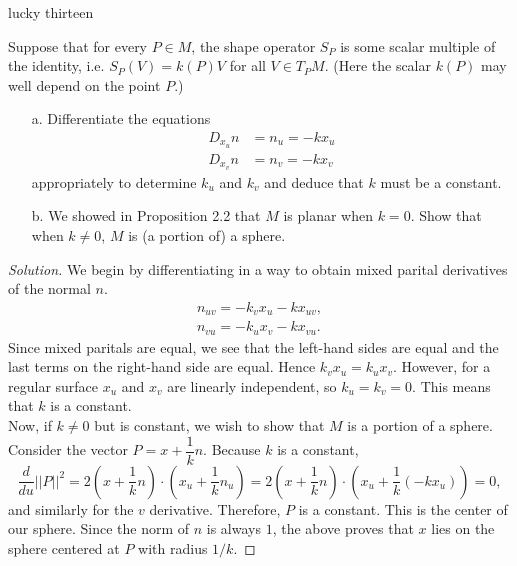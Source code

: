 \documentclass[Shifrin_Solutions_Spring_2018]{subfiles}
\begin{document}
\begin{exercise}
lucky thirteen
\end{exercise}

\begin{exercise}
Suppose that for every $P \in M$, the shape operator $S_P$ is some scalar multiple of the identity, i.e. $S_P(V) = k(P)V$ for all $V \in T_PM$. (Here the scalar $k(P)$ may well depend on the point $P$.)
\begin{itemize}
\item[a.] Differentiate the equations
\begin{align*}
D_{x_u} n & = n_u  = -k x_u \\
D_{x_v} n & = n_v  = -k x_v
\end{align*}
appropriately to determine $k_u$ and $k_v$ and deduce that $k$ must be a constant.

\item[b.] We showed in Proposition 2.2 that $M$ is planar when $k=0$. Show that when $k\neq 0$, $M$ is (a portion of) a sphere.
\end{itemize}
\end{exercise}

\begin{proof}[Solution]
We begin by differentiating in a way to obtain mixed parital derivatives of the normal $n$.
\begin{align*}
n_{uv} = -k_v x_u - k x_{uv}, \\
n_{vu} = -k_u x_v - k x_{vu} .
\end{align*}
Since mixed paritals are equal, we see that the left-hand sides are equal and the last terms on the right-hand side are equal. Hence $k_v x_u = k_u x_v$. However, for a regular surface $x_u$ and $x_v$ are linearly independent, so $k_u=k_v=0$. This means that $k$ is a constant.\\

Now, if $k\neq 0$ but is constant, we wish to show that $M$ is a portion of a sphere. Consider the vector $P = x + \dfrac{1}{k} n$.  Because $k$ is a constant,
\[
\dfrac{d}{du} ||P||^2 =2 \left( x + \dfrac{1}{k}n\right) \cdot \left( x_u + \dfrac{1}{k} n_u\right) = 2\left( x + \dfrac{1}{k}n\right) \cdot \left( x_u + \dfrac{1}{k}(-k x_u)\right) = 0,
\]
and similarly for the $v$ derivative. Therefore, $P$ is a constant. This is the center of our sphere. Since the norm of $n$ is always $1$, the above proves that $x$ lies on the sphere centered at $P$ with radius $1/k$.
\end{proof}
\end{document}
